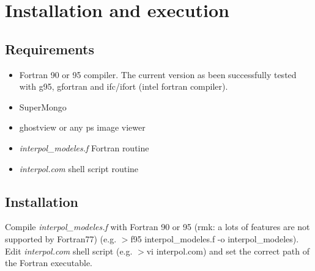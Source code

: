 \documentclass[11pt]{article}
\begin{document}
\section{Installation and execution}
\subsection{Requirements}
\begin{itemize}
\item Fortran 90 or 95 compiler. The current version as been successfully tested with g95, gfortran and ifc/ifort (intel fortran compiler).
\item SuperMongo
\item ghostview or any ps image viewer
\item \textit{interpol\_modeles.f} Fortran routine
\item \textit{interpol.com} shell script routine 
\end{itemize}

\subsection{Installation}
Compile \textit{interpol\_modeles.f} with Fortran 90 or 95 (rmk: a lots of features are not supported by Fortran77) (e.g. $>$f95 interpol\_modeles.f -o interpol\_modeles).\\
Edit \textit{interpol.com} shell script (e.g. $>$vi interpol.com) and set the correct path of the Fortran executable.
\end{document}
